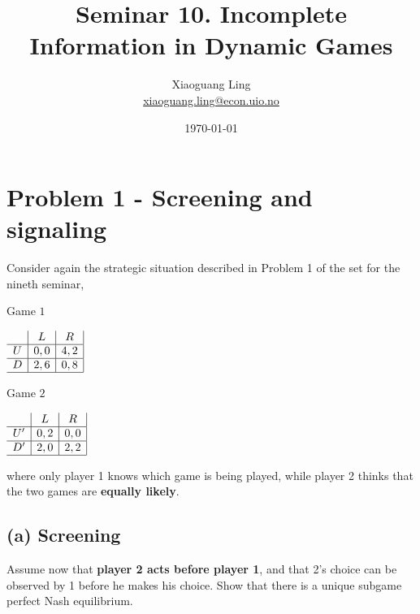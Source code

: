\documentclass{article}
\title{Seminar 10. Incomplete Information in Dynamic Games}
\author{Xiaoguang Ling \\  \href{xiaoguang.ling@econ.uio.no}{xiaoguang.ling@econ.uio.no}}
\date{\today}
\begin{document}
\maketitle
 
\section{Problem 1 - Screening and signaling}

Consider again the strategic situation described in Problem 1 of the set for the nineth seminar, 

\begin{center}
Game $1$ \vspace{6pt}

$
\begin{array}{c|c|c|}
 & L & R \\
\hline
U & 0,0 & 4,2 \\
\hline
D & 2,6 & 0,8 \\
\hline
\end{array}
$
\end{center}

\begin{center}
Game $2$ \vspace{6pt}

$
\begin{array}{c|c|c|}
 & L & R \\
\hline
U' & 0,2 & 0,0 \\
\hline
D' & 2,0 & 2,2 \\
\hline
\end{array}
$
\end{center}

where only player 1 knows which game is being played, while player 2 thinks that the two games are \textbf{equally likely}.


\subsection*{(a) Screening} Assume now that \textbf{player 2 acts before player 1}, and that 2's choice can be observed by 1 before he makes his choice. Show that there is a unique subgame perfect Nash equilibrium. 
\end{document}
